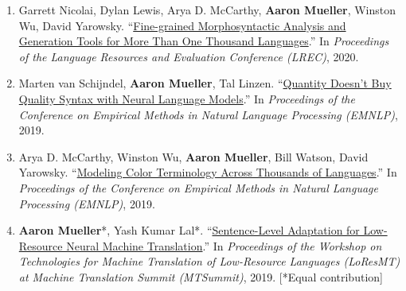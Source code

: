 \documentclass[10pt]{article}
\newcommand{\halfblankline}{\quad\vspace{-0.5\baselineskip}\pagebreak[3]}
\providecommand*\titlelink[2]{\href{#1}{\textcolor{accent}{#2}}}
\begin{document}
\begin{enumerate}[leftmargin=*, topsep=0pt, itemsep=0.25ex, partopsep=0ex, parsep=1ex]
	\item Garrett Nicolai, Dylan Lewis, Arya D. McCarthy, \textbf{Aaron Mueller}, Winston Wu, David Yarowsky. ``\titlelink{https://aclanthology.org/2020.lrec-1.488/}{Fine-grained Morphosyntactic Analysis and Generation Tools for More Than One Thousand Languages}.'' In \emph{Proceedings of the Language Resources and Evaluation Conference (LREC)}, 2020.

	\item Marten van Schijndel, \textbf{Aaron Mueller}, Tal Linzen. ``\titlelink{https://aclanthology.org/D19-1592/}{Quantity Doesn't Buy Quality Syntax with Neural Language Models}.'' In \emph{Proceedings of the Conference on Empirical Methods in Natural Language Processing (EMNLP)}, 2019.

	\item Arya D. McCarthy, Winston Wu, \textbf{Aaron Mueller}, Bill Watson, David Yarowsky. ``\titlelink{https://aclanthology.org/D19-1229/}{Modeling Color Terminology Across Thousands of Languages}.'' In \emph{Proceedings of the Conference on Empirical Methods in Natural Language Processing (EMNLP)}, 2019.

	\item \textbf{Aaron Mueller}*, Yash Kumar Lal*. ``\titlelink{https://aclanthology.org/W19-6807/}{Sentence-Level Adaptation for Low-Resource Neural Machine Translation}.'' In \emph{Proceedings of the Workshop on Technologies for Machine Translation of Low-Resource Languages (LoResMT) at Machine Translation Summit (MTSummit)}, 2019. [*Equal contribution]\label{pub:sent-level}
	\end{enumerate}

	\halfblankline
\end{document}

